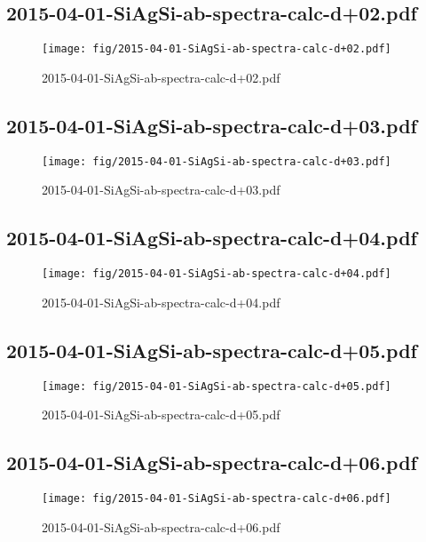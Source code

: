 \documentclass[fullscreen=true]{beamer}
\begin{document}
\subsection{2015-04-01-SiAgSi-ab-spectra-calc-d+02.pdf}
\begin{frame}
  \begin{figure}
    \texttt{[image: fig/2015-04-01-SiAgSi-ab-spectra-calc-d+02.pdf]}%
    \caption{2015-04-01-SiAgSi-ab-spectra-calc-d+02.pdf}
  \end{figure}
\end{frame}

\subsection{2015-04-01-SiAgSi-ab-spectra-calc-d+03.pdf}
\begin{frame}
  \begin{figure}
    \texttt{[image: fig/2015-04-01-SiAgSi-ab-spectra-calc-d+03.pdf]}%
    \caption{2015-04-01-SiAgSi-ab-spectra-calc-d+03.pdf}
  \end{figure}
\end{frame}

\subsection{2015-04-01-SiAgSi-ab-spectra-calc-d+04.pdf}
\begin{frame}
  \begin{figure}
    \texttt{[image: fig/2015-04-01-SiAgSi-ab-spectra-calc-d+04.pdf]}%
    \caption{2015-04-01-SiAgSi-ab-spectra-calc-d+04.pdf}
  \end{figure}
\end{frame}

\subsection{2015-04-01-SiAgSi-ab-spectra-calc-d+05.pdf}
\begin{frame}
  \begin{figure}
    \texttt{[image: fig/2015-04-01-SiAgSi-ab-spectra-calc-d+05.pdf]}%
    \caption{2015-04-01-SiAgSi-ab-spectra-calc-d+05.pdf}
  \end{figure}
\end{frame}

\subsection{2015-04-01-SiAgSi-ab-spectra-calc-d+06.pdf}
\begin{frame}
  \begin{figure}
    \texttt{[image: fig/2015-04-01-SiAgSi-ab-spectra-calc-d+06.pdf]}%
    \caption{2015-04-01-SiAgSi-ab-spectra-calc-d+06.pdf}
  \end{figure}
\end{frame}
\end{document}
